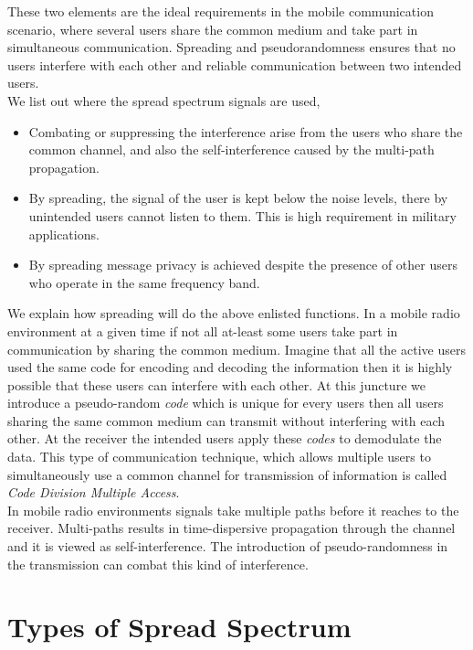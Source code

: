 These two elements are the ideal requirements in the mobile communication scenario, where several users share the common medium and take part in simultaneous communication. Spreading and pseudorandomness ensures that no users interfere with each other and reliable communication between two intended users. \\

We list out where the spread spectrum signals are used, 

\begin{itemize}
\item Combating or suppressing the interference arise from the users who share the common channel, and also the self-interference caused by the multi-path propagation.
\item By spreading, the signal of the user is kept below the noise levels, there by unintended users cannot listen to them. This is high requirement in military applications. 
\item By spreading message privacy is achieved despite the presence of other users who operate in the same frequency band.
\end{itemize}

We explain how spreading will do the above enlisted functions. In a mobile radio environment at a given time if not all at-least some users take part in communication by sharing the common medium. Imagine that all the active users used the same code for encoding and decoding the information then it is highly possible that these users can interfere with each other. At this juncture we introduce a pseudo-random \textit{code} which is unique for every users then all users sharing the same common medium can transmit without interfering with each other. At the receiver the intended users apply these \textit{codes} to demodulate the data. This type of communication technique, which allows multiple users to 
simultaneously use a common channel for transmission of information is called \textit{Code Division Multiple Access}.\\

In mobile radio environments signals take multiple paths before it reaches to the receiver. Multi-paths results in time-dispersive propagation through the channel and it is viewed as self-interference. The introduction of pseudo-randomness in the transmission can combat this kind of interference. 

\section{Types of Spread Spectrum}

